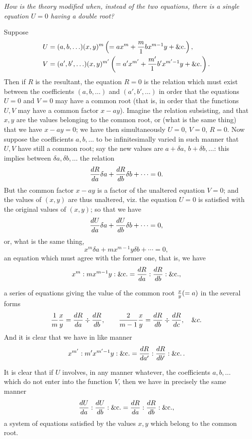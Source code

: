 \documentclass[11pt,a4paper]{article}
\theoremstyle{plain}
\theoremstyle{definition}
\newcommand{\bc}{\mathop{\&\mathrm{c}.}}
\begin{document}
\textit{How is the theory modified when, instead of the two equations, there is a single equation $U=0$ having a double root?}

Suppose
\[
\begin{aligned}
U&=(a,b,\ldots)(x,y)^m\left(=ax^m+{m\over1}bx^{m-1}y+\bc\right),\\
V&=(a',b',\ldots)(x,y)^{m'}\left(=a'x^{m'}+{m'\over1}b'x^{m'-1}y+\bc\right).
\end{aligned}
\]
Then if $R$ is the resultant, the equation $R=0$ is the relation which must exist between the coefficients $(a,b,\ldots)$ and $(a',b',\ldots)$ in order that the equations $U=0$ and $V=0$ may have a common root (that is, in order that the functions $U,V$ may have a common factor $x-ay$). Imagine the relation subsisting, and that $x,y$ are the values belonging to the common root, or (what is the same thing) that we have $x-ay=0$; we have then simultaneously $U=0$, $V=0$, $R=0$. Now suppose the coefficients $a,b,\ldots$ to be infinitesimally varied in such manner that $U,V$ have still a common root; say the new values are $a+\delta a$, $b+\delta b,\ldots$: this implies between $\delta a,\delta b,\ldots$ the relation
\[
{dR\over da}\delta a+{dR\over db}\delta b+\cdots=0.
\]
But the common factor $x-ay$ is a factor of the unaltered equation $V=0$; and the values of $(x,y)$ are thus unaltered, viz. the equation $U=0$ is satisfied with the original values of $(x,y)$; so that we have
\[
{dU\over da}\delta a+{dU\over db}\delta b+\cdots=0,
\]
or, what is the same thing,
\[
x^m\delta a+mx^{m-1}y\delta b+\cdots=0,
\]
an equation which must agree with the former one, that is, we have
\[
x^m:mx^{m-1}y:\bc={dR\over da}:{dR\over db}:\bc,
\]

\newpage

a series of equations giving the value of the common root ${x\over y}(=a)$ in the several forms
\[
{1\over m}{x\over y}={dR\over da}\div {dR\over db},\qquad
{2\over m-1}{x\over y}={dR\over db}\div {dR\over dc},\quad \&c.
\]
And it is clear that we have in like manner
\[
x^{m'}:m'x^{m'-1}y:\bc={dR\over da'}:{dR\over db'}:\bc.
\]

It is clear that if $U$ involves, in any manner whatever, the coefficients $a,b,\ldots$ which do not enter into the function $V$, then we have in precisely the same manner
\[
{dU\over da}:{dU\over db}:\bc={dR\over da}:{dR\over db}:\bc,
\]
a system of equations satisfied by the values $x,y$ which belong to the common root.
\end{document}
